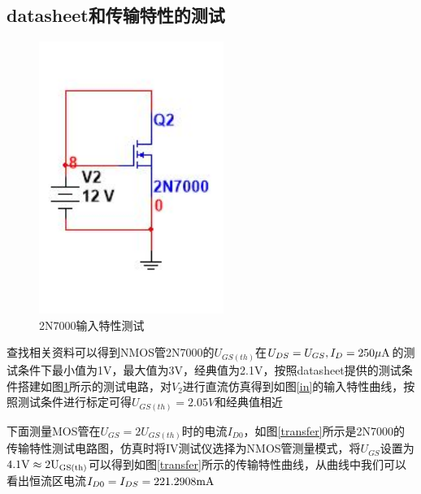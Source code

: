 \documentclass[UTF8,a4paper]{ctexart}
\begin{document}
\subsection{datasheet和传输特性的测试}
\begin{figure}
\includegraphics[width=60mm]{2-1.jpg}
\caption{2N7000输入特性测试}
\label{2in}
\end{figure}
查找相关资料可以得到NMOS管2N7000的$U_{GS(th)}$在$U_{DS}=U_{GS},I_D=250\mu\rm{A}$的测试条件下最小值为1V，最大值为3V，经典值为2.1V，按照datasheet提供的测试条件搭建如图\ref{2in}所示的测试电路，对$V_2$进行直流仿真得到如图\ref{in}的输入特性曲线，按照测试条件进行标定可得$U_{GS(th)}=2.05V$和经典值相近

下面测量MOS管在$U_{GS}=2U_{GS(th)}$时的电流$I_{D0}$，如图\ref{transfer}所示是2N7000的传输特性测试电路图，仿真时将IV测试仪选择为NMOS管测量模式，将$U_{GS}$设置为$4.1\rm{V}\approx2U_{GS(th)}$可以得到如图\ref{transfer}所示的传输特性曲线，从曲线中我们可以看出恒流区电流$I_{D0}=I_{DS}=221.2908\rm{mA}$
\end{document}
